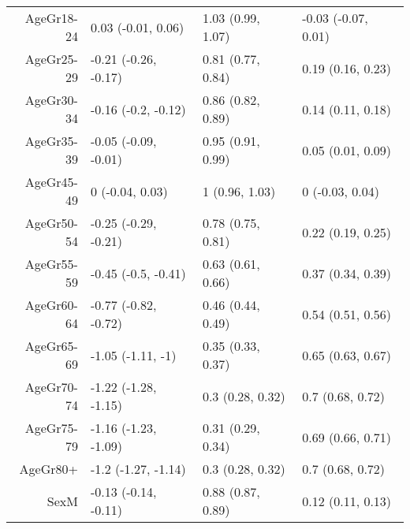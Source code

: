 \begin{table}[ht]
\begin{tabular}{rlll}
  AgeGr18-24 & 0.03 (-0.01, 0.06) & 1.03 (0.99, 1.07) & -0.03 (-0.07, 0.01) \\ 
  AgeGr25-29 & -0.21 (-0.26, -0.17) & 0.81 (0.77, 0.84) & 0.19 (0.16, 0.23) \\ 
  AgeGr30-34 & -0.16 (-0.2, -0.12) & 0.86 (0.82, 0.89) & 0.14 (0.11, 0.18) \\ 
  AgeGr35-39 & -0.05 (-0.09, -0.01) & 0.95 (0.91, 0.99) & 0.05 (0.01, 0.09) \\ 
  AgeGr45-49 & 0 (-0.04, 0.03) & 1 (0.96, 1.03) & 0 (-0.03, 0.04) \\ 
  AgeGr50-54 & -0.25 (-0.29, -0.21) & 0.78 (0.75, 0.81) & 0.22 (0.19, 0.25) \\ 
  AgeGr55-59 & -0.45 (-0.5, -0.41) & 0.63 (0.61, 0.66) & 0.37 (0.34, 0.39) \\ 
  AgeGr60-64 & -0.77 (-0.82, -0.72) & 0.46 (0.44, 0.49) & 0.54 (0.51, 0.56) \\ 
  AgeGr65-69 & -1.05 (-1.11, -1) & 0.35 (0.33, 0.37) & 0.65 (0.63, 0.67) \\ 
  AgeGr70-74 & -1.22 (-1.28, -1.15) & 0.3 (0.28, 0.32) & 0.7 (0.68, 0.72) \\ 
  AgeGr75-79 & -1.16 (-1.23, -1.09) & 0.31 (0.29, 0.34) & 0.69 (0.66, 0.71) \\ 
  AgeGr80+ & -1.2 (-1.27, -1.14) & 0.3 (0.28, 0.32) & 0.7 (0.68, 0.72) \\ 
  SexM & -0.13 (-0.14, -0.11) & 0.88 (0.87, 0.89) & 0.12 (0.11, 0.13) \\ 
   \hline
\end{tabular}
\end{table}

